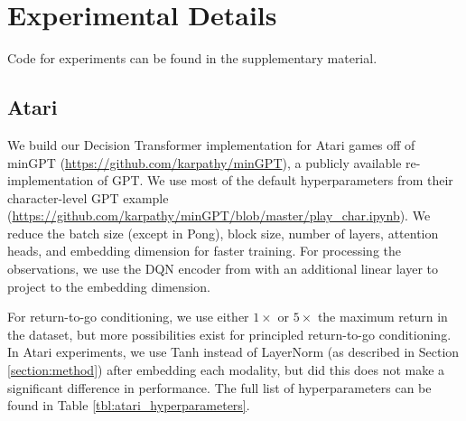 
\section{Experimental Details}


Code for experiments can be found in the supplementary material.

\subsection{Atari} \label{appendix:atari_hyperparameters}

We build our Decision Transformer implementation for Atari games off of minGPT (\url{https://github.com/karpathy/minGPT}), a publicly available re-implementation of GPT. We use most of the default hyperparameters from their character-level GPT example (\url{https://github.com/karpathy/minGPT/blob/master/play_char.ipynb}).
We reduce the batch size (except in Pong), block size, number of layers, attention heads, and embedding dimension for faster training.
For processing the observations, we use the DQN encoder from \citet{mnih2015human} with an additional linear layer to project to the embedding dimension.

For return-to-go conditioning, we use either $1\times$ or $5\times$ the maximum return in the dataset, but more possibilities exist for principled return-to-go conditioning.
In Atari experiments, we use Tanh instead of LayerNorm (as described in Section \ref{section:method}) after embedding each modality, but did this does not make a significant difference in performance.
The full list of hyperparameters can be found in Table \ref{tbl:atari_hyperparameters}.

